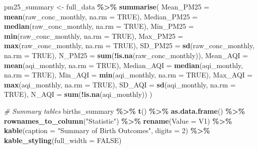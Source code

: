 \documentclass[
]{article}
\newenvironment{Shaded}{\begin{snugshade}}{\end{snugshade}}
\newcommand{\AttributeTok}[1]{\textcolor[rgb]{0.13,0.29,0.53}{#1}}
\newcommand{\CommentTok}[1]{\textcolor[rgb]{0.56,0.35,0.01}{\textit{#1}}}
\newcommand{\ConstantTok}[1]{\textcolor[rgb]{0.56,0.35,0.01}{#1}}
\newcommand{\DecValTok}[1]{\textcolor[rgb]{0.00,0.00,0.81}{#1}}
\newcommand{\FunctionTok}[1]{\textcolor[rgb]{0.13,0.29,0.53}{\textbf{#1}}}
\newcommand{\NormalTok}[1]{#1}
\newcommand{\OtherTok}[1]{\textcolor[rgb]{0.56,0.35,0.01}{#1}}
\newcommand{\SpecialCharTok}[1]{\textcolor[rgb]{0.81,0.36,0.00}{\textbf{#1}}}
\newcommand{\StringTok}[1]{\textcolor[rgb]{0.31,0.60,0.02}{#1}}
\begin{document}
\begin{Shaded}
\begin{Highlighting}[]
\NormalTok{pm25\_summary }\OtherTok{\textless{}{-}}\NormalTok{ full\_data }\SpecialCharTok{\%\textgreater{}\%} \FunctionTok{summarise}\NormalTok{(}
  \AttributeTok{Mean\_PM25 =} \FunctionTok{mean}\NormalTok{(raw\_conc\_monthly, }\AttributeTok{na.rm =} \ConstantTok{TRUE}\NormalTok{),}
  \AttributeTok{Median\_PM25 =} \FunctionTok{median}\NormalTok{(raw\_conc\_monthly, }\AttributeTok{na.rm =} \ConstantTok{TRUE}\NormalTok{),}
  \AttributeTok{Min\_PM25 =} \FunctionTok{min}\NormalTok{(raw\_conc\_monthly, }\AttributeTok{na.rm =} \ConstantTok{TRUE}\NormalTok{),}
  \AttributeTok{Max\_PM25 =} \FunctionTok{max}\NormalTok{(raw\_conc\_monthly, }\AttributeTok{na.rm =} \ConstantTok{TRUE}\NormalTok{),}
  \AttributeTok{SD\_PM25 =} \FunctionTok{sd}\NormalTok{(raw\_conc\_monthly, }\AttributeTok{na.rm =} \ConstantTok{TRUE}\NormalTok{),}
  \AttributeTok{N\_PM25 =} \FunctionTok{sum}\NormalTok{(}\SpecialCharTok{!}\FunctionTok{is.na}\NormalTok{(raw\_conc\_monthly)),}
  \AttributeTok{Mean\_AQI =} \FunctionTok{mean}\NormalTok{(aqi\_monthly, }\AttributeTok{na.rm =} \ConstantTok{TRUE}\NormalTok{),}
  \AttributeTok{Median\_AQI =} \FunctionTok{median}\NormalTok{(aqi\_monthly, }\AttributeTok{na.rm =} \ConstantTok{TRUE}\NormalTok{),}
  \AttributeTok{Min\_AQI =} \FunctionTok{min}\NormalTok{(aqi\_monthly, }\AttributeTok{na.rm =} \ConstantTok{TRUE}\NormalTok{),}
  \AttributeTok{Max\_AQI =} \FunctionTok{max}\NormalTok{(aqi\_monthly, }\AttributeTok{na.rm =} \ConstantTok{TRUE}\NormalTok{),}
  \AttributeTok{SD\_AQI =} \FunctionTok{sd}\NormalTok{(aqi\_monthly, }\AttributeTok{na.rm =} \ConstantTok{TRUE}\NormalTok{),}
  \AttributeTok{N\_AQI =} \FunctionTok{sum}\NormalTok{(}\SpecialCharTok{!}\FunctionTok{is.na}\NormalTok{(aqi\_monthly))}
\NormalTok{)}

\CommentTok{\# Summary tables}
\NormalTok{births\_summary }\SpecialCharTok{\%\textgreater{}\%}
  \FunctionTok{t}\NormalTok{() }\SpecialCharTok{\%\textgreater{}\%} \FunctionTok{as.data.frame}\NormalTok{() }\SpecialCharTok{\%\textgreater{}\%}
  \FunctionTok{rownames\_to\_column}\NormalTok{(}\StringTok{"Statistic"}\NormalTok{) }\SpecialCharTok{\%\textgreater{}\%}
  \FunctionTok{rename}\NormalTok{(}\AttributeTok{Value =}\NormalTok{ V1) }\SpecialCharTok{\%\textgreater{}\%}
  \FunctionTok{kable}\NormalTok{(}\AttributeTok{caption =} \StringTok{"Summary of Birth Outcomes"}\NormalTok{, }\AttributeTok{digits =} \DecValTok{2}\NormalTok{) }\SpecialCharTok{\%\textgreater{}\%}
  \FunctionTok{kable\_styling}\NormalTok{(}\AttributeTok{full\_width =} \ConstantTok{FALSE}\NormalTok{)}
\end{Highlighting}
\end{Shaded}
\end{document}
